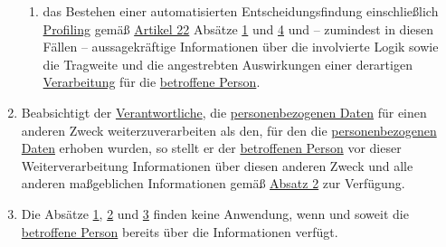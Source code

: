 \begin{enumerate}
\begin{enumerate}
    \item das Bestehen einer automatisierten Entscheidungsfindung einschließlich \hyperref[itm:04-4]{Profiling} gemäß \hyperref[ch:22]
     {Artikel 22} Absätze \hyperref[itm:22-1]{1} und \hyperref[itm:22-4]{4} und -- zumindest in diesen Fällen --
     aussagekräftige Informationen über die involvierte Logik sowie die Tragweite und die angestrebten Auswirkungen
     einer derartigen \hyperref[itm:04-2]{Verarbeitung} für die \hyperref[itm:04-1]{betroffene Person}.
    \label{itm:13-2f}

  \end{enumerate}

  \item Beabsichtigt der \hyperref[itm:04-7]{Verantwortliche}, die \hyperref[itm:04-1]{personenbezogenen Daten} für einen anderen Zweck weiterzuverarbeiten als
   den, für den die \hyperref[itm:04-1]{personenbezogenen Daten} erhoben wurden, so stellt er der \hyperref[itm:04-1]{betroffenen Person} vor dieser
   Weiterverarbeitung Informationen über diesen anderen Zweck und alle anderen maßgeblichen Informationen gemäß
   \hyperref[itm:13-2]{Absatz 2} zur Verfügung.
  \label{itm:13-3}  

  \item Die Absätze \hyperref[itm:13-1]{1}, \hyperref[itm:13-2]{2} und \hyperref[itm:13-3]{3} finden keine Anwendung,
   wenn und soweit die \hyperref[itm:04-1]{betroffene Person} bereits über die Informationen verfügt.
  \label{itm:13-4}  

\end{enumerate}



